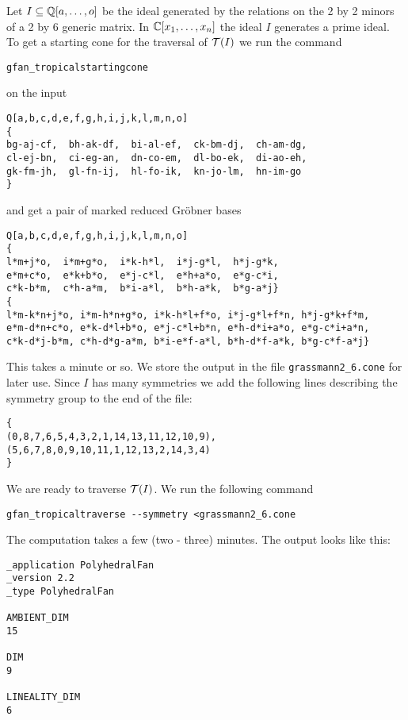 \begin{example}
Let $I\subseteq\mathbb{Q}[a,\dots,o]$ be the ideal generated by the relations
on the 2 by 2 minors of a 2 by 6 generic matrix.  In $\mathbb{C}[x_1,\dots,x_n]$ the
ideal $I$ generates a prime ideal.  To get a starting cone for the
traversal of $ \mathcal{T} (I)$ we run the command
\begin{verbatim}
gfan_tropicalstartingcone
\end{verbatim}
on the input
\begin{verbatim}
Q[a,b,c,d,e,f,g,h,i,j,k,l,m,n,o]
{
bg-aj-cf,  bh-ak-df,  bi-al-ef,  ck-bm-dj,  ch-am-dg,
cl-ej-bn,  ci-eg-an,  dn-co-em,  dl-bo-ek,  di-ao-eh,
gk-fm-jh,  gl-fn-ij,  hl-fo-ik,  kn-jo-lm,  hn-im-go
}
\end{verbatim}
and get a pair of marked reduced Gr\"obner bases
\begin{verbatim}
Q[a,b,c,d,e,f,g,h,i,j,k,l,m,n,o]
{
l*m+j*o,  i*m+g*o,  i*k-h*l,  i*j-g*l,  h*j-g*k,
e*m+c*o,  e*k+b*o,  e*j-c*l,  e*h+a*o,  e*g-c*i,
c*k-b*m,  c*h-a*m,  b*i-a*l,  b*h-a*k,  b*g-a*j}
{
l*m-k*n+j*o, i*m-h*n+g*o, i*k-h*l+f*o, i*j-g*l+f*n, h*j-g*k+f*m,
e*m-d*n+c*o, e*k-d*l+b*o, e*j-c*l+b*n, e*h-d*i+a*o, e*g-c*i+a*n,
c*k-d*j-b*m, c*h-d*g-a*m, b*i-e*f-a*l, b*h-d*f-a*k, b*g-c*f-a*j}
\end{verbatim}
This takes a minute or so. We store the output in the file \texttt{grassmann2\_6.cone} for later use. Since $I$ has many symmetries we add the following lines describing the symmetry group to the end of the file:
\begin{verbatim}
{
(0,8,7,6,5,4,3,2,1,14,13,11,12,10,9),
(5,6,7,8,0,9,10,11,1,12,13,2,14,3,4)
}
\end{verbatim}
We are ready to traverse $ \mathcal{T} (I)$.
We run the following command
\begin{verbatim}
gfan_tropicaltraverse --symmetry <grassmann2_6.cone
\end{verbatim}
The computation takes a few (two - three) minutes. The output looks like this:
\begin{verbatim}
_application PolyhedralFan
_version 2.2
_type PolyhedralFan

AMBIENT_DIM
15

DIM
9

LINEALITY_DIM
6


\end{verbatim}
\end{example}
